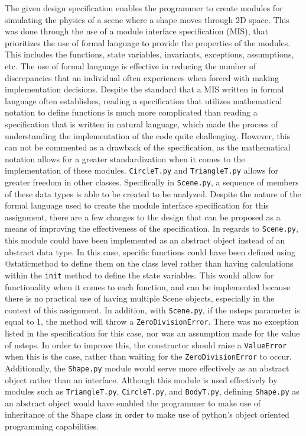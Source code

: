 \documentclass[12pt]{article}
\begin{document}
The given design specification enables the programmer to create modules for simulating the physics of a scene where a shape moves through 2D space. This was done through the use of a module interface specification (MIS), that prioritizes the use of formal language to provide the properties of the modules. This includes the functions, state variables, invariants, exceptions, assumptions, etc. The use of formal language is effective in reducing the number of discrepancies that an individual often experiences when forced with making implementation decisions. Despite the standard that a MIS written in formal language often establishes, reading a specification that utilizes mathematical notation to define functions is much more complicated than reading a specification that is written in natural language, which made the process of understanding the implementation of the code quite challenging. However, this can not be commented as a drawback of the specification, as the mathematical notation allows for a greater standardization when it comes to the implementation of these modules. \texttt{CircleT.py} and \texttt{TriangleT.py} allows for greater freedom in other classes. Specifically in \texttt{Scene.py}, a sequence of members of these data types is able to be created to be analyzed.
\newline
\newline
Despite the nature of the formal language used to create the module interface specification for this assignment, there are a few changes to the design that can be proposed as a means of improving the effectiveness of the specification. In regards to \texttt{Scene.py}, this module could have been implemented as an abstract object instead of an abstract data type. In this case, specific functions could have been defined using @staticmethod to define them on the class level rather than having calculations  within the \texttt{init} method to define the state variables. This would allow for functionality when it comes to each function, and can be implemented because there is no practical use of having multiple Scene objects, especially in the context of this assignment. In addition, with \texttt{Scene.py}, if the nsteps parameter is equal to 1, the method will throw a \texttt{ZeroDivisionError}. There was no exception listed in the specification for this case, nor was an assumption made for the value of nsteps. In order to improve this, the constructor should raise a \texttt{ValueError} when this is the case, rather than waiting for the \texttt{ZeroDivisionError} to occur. Additionally, the \texttt{Shape.py} module would serve more effectively as an abstract object rather than an interface. Although this module is used effectively by modules such as \texttt{TriangleT.py}, \texttt{CircleT.py}, and \texttt{BodyT.py}, defining \texttt{Shape.py} as an abstract object would have enabled the programmer to make use of inheritance of the Shape class in order to make use of python's object oriented programming capabilities. 
\end{document}
